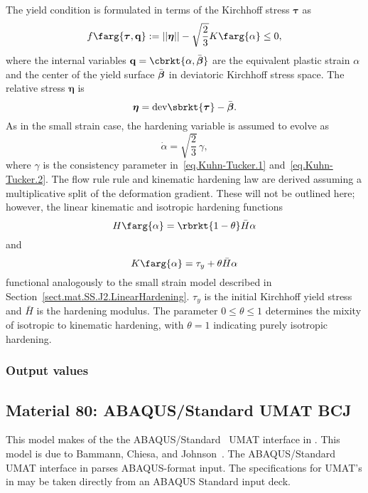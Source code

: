 The yield condition is formulated in terms of the
Kirchhoff stress $\boldsymbol{\tau}$ as
\begin{equation}
	f\farg{\boldsymbol{\tau}, \mathbf{q}} := 
	||\boldsymbol{\eta}|| 
	- \sqrt{\frac{2}{3}} K\farg{\alpha} \le 0,
\end{equation}
where the internal variables 
$\mathbf{q} = \cbrkt{\alpha, \bar{\boldsymbol{\beta}}}$ are
the equivalent plastic strain $\alpha$ and the center of
the yield surface $\Bar{\boldsymbol{\beta}}$ in deviatoric
Kirchhoff stress space. The relative stress $\boldsymbol{\eta}$ is
\begin{equation}
\boldsymbol{\eta} = \textrm{dev}\sbrkt{\boldsymbol\tau} - 
\bar{\boldsymbol{\beta}}.
\end{equation}
As in the small strain case, the hardening variable is assumed
to evolve as
\begin{equation}
\dot{\alpha} = \sqrt{\frac{2}{3}}\,\gamma,	
\end{equation}
where $\gamma$ is the consistency parameter 
in~\eqref{eq.Kuhn-Tucker.1} and~\eqref{eq.Kuhn-Tucker.2}.
The flow rule rule and kinematic hardening law are derived
assuming a multiplicative split of the deformation gradient.
These will not be outlined here; however,
the linear kinematic and isotropic hardening functions
\begin{equation}
	H\farg{\alpha} = \rbrkt{1 - \theta} \bar{H} \alpha
\end{equation}
and
\begin{equation}
	K\farg{\alpha} = \tau_{y} + \theta \bar{H} \alpha
\end{equation}
functional analogously to the small strain model described
in Section~\ref{sect.mat.SS.J2.LinearHardening}.
$\tau_{y}$ is the initial Kirchhoff yield stress and
$\bar{H}$ is the hardening modulus.
The parameter $0 \le \theta \le 1$ determines the mixity of 
isotropic to kinematic hardening, with $\theta = 1$ indicating purely 
isotropic hardening.

\subsubsection{Output values}

\setcounter{subsection}{79}
\subsection{Material 80: \textsf{ABAQUS/Standard UMAT} BCJ}
\label{sect.mat.ABAQUS.BCJ}
This model makes of the the \textsf{ABAQUS/Standard}~\cite{ABAQUSNNNN}
\textsf{UMAT} interface in \tahoe. This model is due to Bammann, 
Chiesa, and Johnson~\cite{BammannNNNN}.
The \textsf{ABAQUS/Standard UMAT} interface in \tahoe parses
\textsf{ABAQUS}-format input. The specifications for
\textsf{UMAT}'s in \tahoe may be taken directly from an
\textsf{ABAQUS Standard} input deck.

